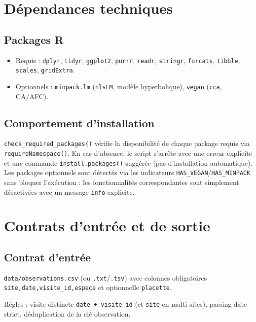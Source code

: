 \documentclass[11pt,a4paper]{article}
\begin{document}
\section{Dépendances techniques}
\subsection{Packages R}
\begin{itemize}[leftmargin=1.2cm]
  \item Requis : \texttt{dplyr}, \texttt{tidyr}, \texttt{ggplot2}, \texttt{purrr}, \texttt{readr}, \texttt{stringr}, \texttt{forcats}, \texttt{tibble}, \texttt{scales}, \texttt{gridExtra}.
  \item Optionnels : \texttt{minpack.lm} (\texttt{nlsLM}, modèle hyperbolique), \texttt{vegan} (\texttt{cca}, CA/AFC).
\end{itemize}

\subsection{Comportement d'installation}
\texttt{check\_required\_packages()} vérifie la disponibilité de chaque package requis via
\texttt{requireNamespace()}. En cas d'absence, le script s'arrête avec une erreur explicite et
une commande \texttt{install.packages()} suggérée (pas d'installation automatique). Les
packages optionnels sont détectés via les indicateurs \texttt{HAS\_VEGAN}/\texttt{HAS\_MINPACK}
sans bloquer l'exécution : les fonctionnalités correspondantes sont simplement désactivées
avec un message \texttt{info} explicite.

\section{Contrats d'entrée et de sortie}

\subsection{Contrat d'entrée}
\texttt{data/observations.csv} (ou \texttt{.txt}/\texttt{.tsv}) avec colonnes obligatoires \texttt{site,date,visite\_id,espece} et optionnelle \texttt{placette}.

Règles : visite distincte \texttt{date + visite\_id} (et \texttt{site} en multi-sites), parsing date strict, déduplication de la clé observation.
\end{document}
